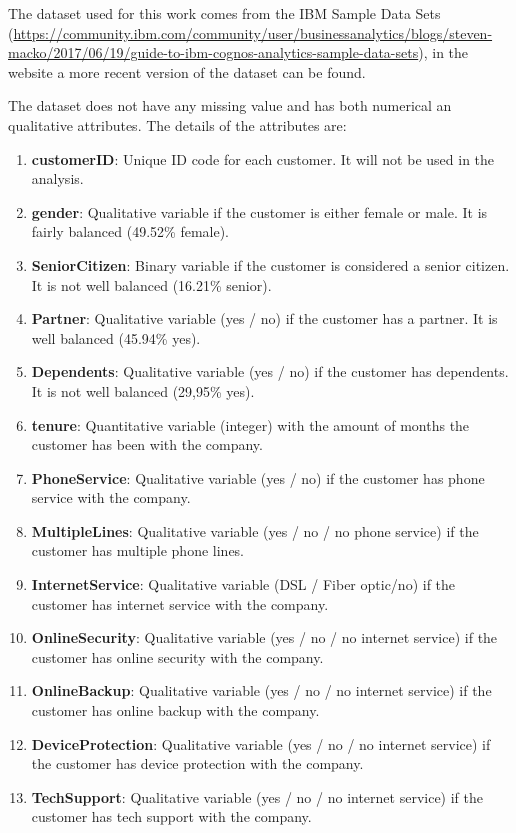 \documentclass[a4paper,11pt]{article}
\begin{document}
The dataset used for this work comes from the IBM Sample Data Sets (\url{https://community.ibm.com/community/user/businessanalytics/blogs/steven-macko/2017/06/19/guide-to-ibm-cognos-analytics-sample-data-sets}), in the website a more recent version of the dataset can be found.

The dataset does not have any missing value and has both numerical an qualitative attributes. The details of the attributes are:

\begin{enumerate}
	\item \textbf{customerID}: Unique ID code for each customer. It will not be used in the analysis.
	\item \textbf{gender}: Qualitative variable if the customer is either female or male. It is fairly balanced (49.52\% female).
	\item \textbf{SeniorCitizen}: Binary variable if the customer is considered a senior citizen. It is not well balanced (16.21\% senior).
	\item \textbf{Partner}: Qualitative variable (yes / no) if the customer has a partner. It is well balanced (45.94\% yes).
	\item \textbf{Dependents}: Qualitative variable (yes / no) if the customer has dependents. It is not well balanced (29,95\% yes).
	\item \textbf{tenure}: Quantitative variable (integer) with the amount of months the customer has been with the company.
	\item \textbf{PhoneService}: Qualitative variable (yes / no) if the customer has phone service with the company.
	\item \textbf{MultipleLines}: Qualitative variable (yes / no / no phone service) if the customer has multiple phone lines.
	\item \textbf{InternetService}: Qualitative variable (DSL / Fiber optic/no) if the customer has internet service with the company.
	\item \textbf{OnlineSecurity}: Qualitative variable (yes / no / no internet service) if the customer has online security with the company.
	\item \textbf{OnlineBackup}: Qualitative variable (yes / no / no internet service) if the customer has online backup with the company.
	\item \textbf{DeviceProtection}: Qualitative variable (yes / no / no internet service) if the customer has device protection with the company.
	\item \textbf{TechSupport}: Qualitative variable (yes / no / no internet service) if the customer has tech support with the company.

\end{enumerate}
\end{document}

